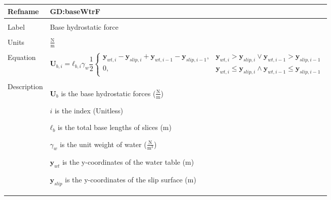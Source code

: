 \documentclass[12pt]{article}
\begin{document}
\noindent \begin{minipage}{\textwidth}
          \begin{tabular}{>{\raggedright}p{}>{\raggedright\arraybackslash}p{}}
          \toprule \textbf{Refname} & \textbf{GD:baseWtrF}
          \label{GD:baseWtrF}
          \\ \midrule \\
          Label & Base hydrostatic force
          \\ \midrule \\
          Units & $\frac{\text{N}}{\text{m}}$
          \\ \midrule \\
          Equation & \begin{displaymath}
                     {\mathbf{U}_{b,i}}={\mathbf{ℓ}_{b,i}} {γ_{w}} \frac{1}{2} \begin{cases}
                                                                               {\mathbf{y}_{wt,i}}-{\mathbf{y}_{slip,i}}+{\mathbf{y}_{wt,i-1}}-{\mathbf{y}_{slip,i-1}}, & {\mathbf{y}_{wt,i}}>{\mathbf{y}_{slip,i}}\lor{}{\mathbf{y}_{wt,i-1}}>{\mathbf{y}_{slip,i-1}}\\
0, & {\mathbf{y}_{wt,i}}\leq{}{\mathbf{y}_{slip,i}}\land{}{\mathbf{y}_{wt,i-1}}\leq{}{\mathbf{y}_{slip,i-1}}
                                                                               \end{cases}
                     \end{displaymath}
          \\ \midrule \\
          Description & \begin{symbDescription}
                        \item{${\mathbf{U}_{b}}$ is the base hydrostatic forces ($\frac{\text{N}}{\text{m}}$)}
                        \item{$i$ is the index (Unitless)}
                        \item{${\mathbf{ℓ}_{b}}$ is the total base lengths of slices (m)}
                        \item{${γ_{w}}$ is the unit weight of water ($\frac{\text{N}}{\text{m}^{3}}$)}
                        \item{${\mathbf{y}_{wt}}$ is the y-coordinates of the water table (m)}
                        \item{${\mathbf{y}_{slip}}$ is the y-coordinates of the slip surface (m)}
                        \end{symbDescription}

\end{tabular}
\end{minipage}
\end{document}
